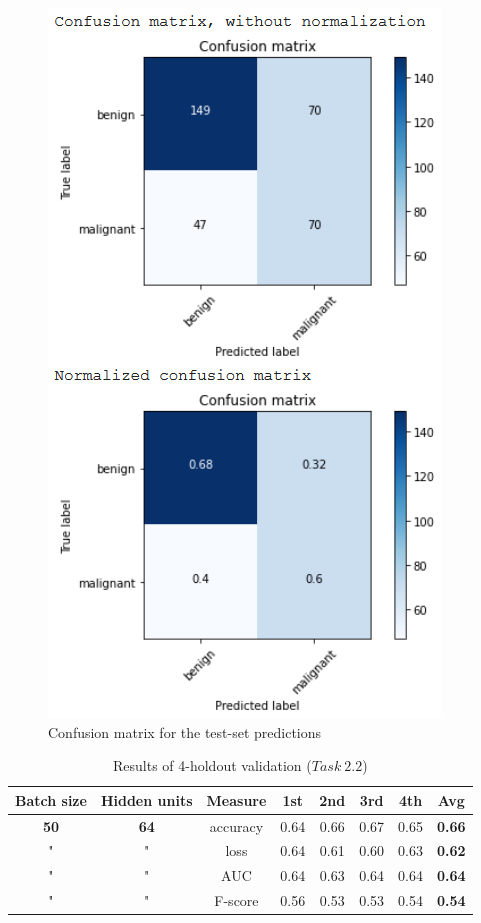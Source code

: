 \documentclass[11pt,a4paper,oneside]{article}
\begin{document}
\begin{figure}[h]
\begin{minipage}[c]{.4\textwidth}
		\includegraphics[width=.9\textwidth]{images/2.2/5_matrix}
		\caption{Confusion matrix for the test-set predictions}
		\label{fig:matrix_2.2_1}
	\end{minipage}%
\end{figure}

\begin{table}[h]
\centering
\begin{tabular}{|cccccccc|}
\hline
Batch size & Hidden units & Measure & 1st & 2nd & 3rd & 4th & \textbf{Avg} \\
\hline
\textbf{50} & \textbf{64} & accuracy & 0.64 & 0.66 & 0.67 & 0.65 & \textbf{0.66} \\
" & " & loss & 0.64 & 0.61 & 0.60 & 0.63 & \textbf{0.62} \\
" & " & AUC & 0.64 & 0.63 & 0.64 & 0.64 & \textbf{0.64} \\
" & " & F-score & 0.56 & 0.53 & 0.53 & 0.54 & \textbf{0.54} \\
\hline
\end{tabular}
\caption{Results of 4-holdout validation ($Task\ 2.2$)}
\label{tab:task2.2}
\end{table}
\end{document}
